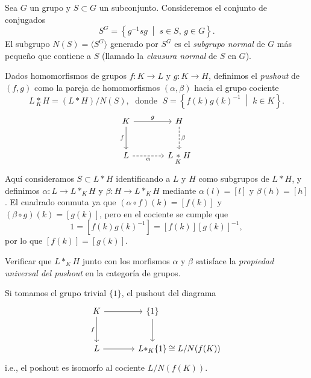 \begin{definicion}
Sea $G$ un grupo y $S \subset G$ un subconjunto. Consideremos el conjunto de conjugados
\[
S^G = \left\{ g^{-1} s g \;\middle|\; s \in S, \, g \in G \right\}.
\]
El subgrupo $N(S) = \langle S^G \rangle$ generado por $S^G$ es el \textit{subgrupo normal} de $G$ más pequeño que contiene a $S$ (llamado la \textit{clausura normal} de $S$ en $G$).
\end{definicion}

\begin{definicion}
Dados homomorfismos de grupos $f \colon K \to L$ y $g \colon K \to H$, definimos el \textit{pushout} de $(f, g)$ como la pareja de homomorfismos $(\alpha, \beta)$ hacia el grupo cociente
\[
L \underset{K}{\ast} H = (L \ast H) / N(S), \; \text{ donde } \; S = \left\{ f(k) g(k)^{-1} \;\middle|\; k \in K \right\}.
\]
\[
\begin{tikzcd}[row sep=large, column sep=large]
K \arrow[r, "g"] \arrow[d, "f"'] & H \arrow[d, "\beta", dashed] \\
L \arrow[r, "\alpha"', dashed] & L \underset{K}{\ast} H
\end{tikzcd}
\]
Aquí consideramos $S \subset L \ast H$ identificando a $L$ y $H$ como subgrupos de $L \ast H$, y definimos $\alpha \colon L \to L{\ast}_{K} H$ y $\beta \colon H \to L{\ast}_K H$ mediante $\alpha(l) = [l]$ y $\beta(h) = [h]$. El cuadrado conmuta ya que $(\alpha \circ f)(k) = [f(k)]$ y $(\beta \circ g)(k) = [g(k)]$, pero en el cociente se cumple que
\[
1 = [ f(k) g(k)^{-1} ] = [f(k)] [g(k)]^{-1},
\]
por lo que $[f(k)] = [g(k)]$.
\end{definicion}

\begin{ejercicio}
Verificar que $L{\ast}_{K} H$ junto con los morfismos $\alpha$ y $\beta$ satisface la \textit{propiedad universal del pushout} en la categoría de grupos.
\end{ejercicio}

\begin{ejemplo}
Si tomamos el grupo trivial $\{1\}$, el pushout del diagrama
\[
\begin{tikzcd}[row sep=large, column sep=large]
K \arrow[r] \arrow[d, "f"'] & \{1\} \arrow[d] \\
L \arrow[r] & L{\ast}_{K} \{1\}&[-1.5cm] \cong L / N(f(K))
\end{tikzcd}
\]
i.e., el poshout es isomorfo al cociente $L / N(f(K))$.
\end{ejemplo}

